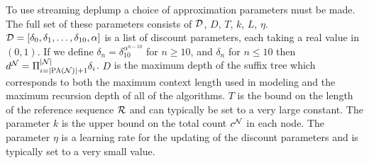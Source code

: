 To use streaming deplump a choice of approximation  parameters must be made.  The full set of these parameters consists of $\D$, $D$, $T$, $k$, $L$, $\eta$.  $\D = [\dd_0, \dd_1, \ldots, \dd_{10}, \alpha]$ is a list of discount parameters, each taking a real value in $(0,1)$.  If we define $\delta_{n} = \delta_{10}^{\alpha^{n - 10}}$ for $n \geq 10$, and $\delta_n$ for $n \leq 10$ then $d^{\N} = \Pi_{i =|\textsc{PA}(\N)| + 1}^{|\N|} \delta_{i}$.  $D$ is the maximum depth of the suffix tree which corresponds to both the maximum context length used in modeling and the maximum recursion depth of all of the algorithms.  $T$ is the bound on the length of the reference sequence $\RS$ and can typically be set to a very large constant.  The parameter $k$ is the upper bound on the total count $c^\N$ in each node.  The parameter $\eta$ is a learning rate for the updating of the discount parameters and is typically set to a very small value.  






%
%
%				
%
